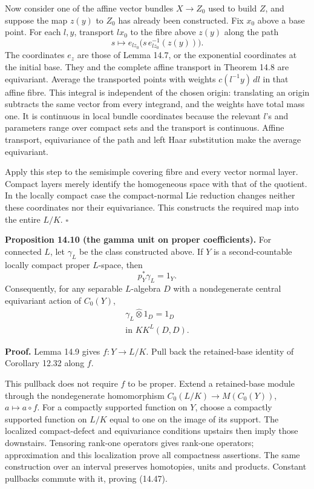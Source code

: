 \documentclass[
  11pt,
]{article}
\begin{document}
Now consider one of the affine vector bundles \(X\to Z_0\) used to build
\(Z\), and suppose the map \(z(y)\) to \(Z_0\) has already been
constructed. Fix \(x_0\) above a base point. For each \(l,y\), transport
\(lx_0\) to the fibre above \(z(y)\) along the path \[
s\longmapsto e_{lz_0}
 \big(s\,e_{lz_0}^{-1}(z(y))\big).
\tag{14.46}
\] The coordinates \(e_z\) are those of Lemma 14.7, or the exponential
coordinates at the initial base. They and the complete affine transport
in Theorem 14.8 are equivariant. Average the transported points with
weights \(c(l^{-1}y)\,dl\) in that affine fibre. This integral is
independent of the chosen origin: translating an origin subtracts the
same vector from every integrand, and the weights have total mass one.
It is continuous in local bundle coordinates because the relevant
\(l\)'s and parameters range over compact sets and the transport is
continuous. Affine transport, equivariance of the path and left Haar
substitution make the average equivariant.

Apply this step to the semisimple covering fibre and every vector normal
layer. Compact layers merely identify the homogeneous space with that of
the quotient. In the locally compact case the compact-normal Lie
reduction changes neither these coordinates nor their equivariance. This
constructs the required map into the entire \(L/K\). \(\square\)

\textbf{Proposition 14.10 (the gamma unit on proper coefficients).} For
connected \(L\), let \(\gamma_L\) be the class constructed above. If
\(Y\) is a second-countable locally compact proper \(L\)-space, then \[
p_Y^*\gamma_L=1_Y.
\tag{14.47}
\] Consequently, for any separable \(L\)-algebra \(D\) with a
nondegenerate central equivariant action of \(C_0(Y)\), \[
\begin{gathered}
\gamma_L\widehat\otimes1_D=1_D\\
\text{in }KK^L(D,D).
\end{gathered}
\tag{14.48}
\]

\textbf{Proof.} Lemma 14.9 gives \(f:Y\to L/K\). Pull back the
retained-base identity of Corollary 12.32 along \(f\).

This pullback does not require \(f\) to be proper. Extend a
retained-base module through the nondegenerate homomorphism
\(C_0(L/K)\to M(C_0(Y))\), \(a\mapsto a\circ f\). For a compactly
supported function on \(Y\), choose a compactly supported function on
\(L/K\) equal to one on the image of its support. The localized
compact-defect and equivariance conditions upstairs then imply those
downstairs. Tensoring rank-one operators gives rank-one operators;
approximation and this localization prove all compactness assertions.
The same construction over an interval preserves homotopies, units and
products. Constant pullbacks commute with it, proving (14.47).
\end{document}

